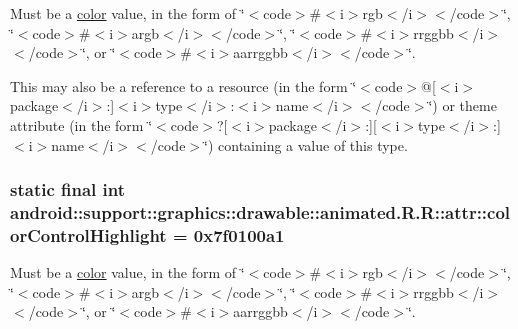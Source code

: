 Must be a \hyperlink{classandroid_1_1support_1_1graphics_1_1drawable_1_1animated_1_1_r_1_1color}{color} value, in the form of \char`\"{}$<$code$>$\#$<$i$>$rgb$<$/i$>$$<$/code$>$\char`\"{}, \char`\"{}$<$code$>$\#$<$i$>$argb$<$/i$>$$<$/code$>$\char`\"{}, \char`\"{}$<$code$>$\#$<$i$>$rrggbb$<$/i$>$$<$/code$>$\char`\"{}, or \char`\"{}$<$code$>$\#$<$i$>$aarrggbb$<$/i$>$$<$/code$>$\char`\"{}. 

This may also be a reference to a resource (in the form \char`\"{}$<$code$>$@\mbox{[}$<$i$>$package$<$/i$>$:\mbox{]}$<$i$>$type$<$/i$>$:$<$i$>$name$<$/i$>$$<$/code$>$\char`\"{}) or theme attribute (in the form \char`\"{}$<$code$>$?\mbox{[}$<$i$>$package$<$/i$>$:\mbox{]}\mbox{[}$<$i$>$type$<$/i$>$:\mbox{]}$<$i$>$name$<$/i$>$$<$/code$>$\char`\"{}) containing a value of this type. \hypertarget{classandroid_1_1support_1_1graphics_1_1drawable_1_1animated_1_1_r_1_1attr_a7654b7657e3f021a4a39d181ebd28e2}{
\subsubsection[{colorControlHighlight}]{\setlength{\rightskip}{0pt plus 5cm}static final int android::support::graphics::drawable::animated.R.R::attr::colorControlHighlight = 0x7f0100a1}}
\label{classandroid_1_1support_1_1graphics_1_1drawable_1_1animated_1_1_r_1_1attr_a7654b7657e3f021a4a39d181ebd28e2}


Must be a \hyperlink{classandroid_1_1support_1_1graphics_1_1drawable_1_1animated_1_1_r_1_1color}{color} value, in the form of \char`\"{}$<$code$>$\#$<$i$>$rgb$<$/i$>$$<$/code$>$\char`\"{}, \char`\"{}$<$code$>$\#$<$i$>$argb$<$/i$>$$<$/code$>$\char`\"{}, \char`\"{}$<$code$>$\#$<$i$>$rrggbb$<$/i$>$$<$/code$>$\char`\"{}, or \char`\"{}$<$code$>$\#$<$i$>$aarrggbb$<$/i$>$$<$/code$>$\char`\"{}. 

